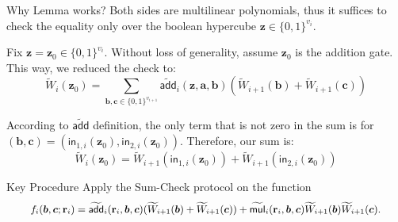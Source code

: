 \documentclass{zkdl-presentation-template}
\begin{document}
    \begin{frame}{Why Lemma works?}
        Both sides are multilinear polynomials, thus it suffices to check the equality only over the 
        boolean hypercube $\mathbf{z} \in \{0,1\}^{v_i}$.

        Fix $\mathbf{z}=\mathbf{z}_0 \in \{0,1\}^{v_i}$. Without loss of generality, assume
        $\mathbf{z}_0$ is the addition gate. This way, we reduced the check to:
        \begin{equation*}
            \widetilde{W}_i(\mathbf{z}_0) = \sum_{\boldsymbol{b},\boldsymbol{c} \in \{0,1\}^{v_{i+1}}} \widetilde{\mathsf{add}}_i(\mathbf{z},\boldsymbol{a},\boldsymbol{b})(\widetilde{W}_{i+1}(\boldsymbol{b}) + \widetilde{W}_{i+1}(\boldsymbol{c}))
        \end{equation*}

         According to $\widetilde{\mathsf{add}}$ definition, the only term that is not
        zero in the sum is for
        $(\boldsymbol{b},\boldsymbol{c})=(\mathsf{in}_{1,i}(\mathbf{z}_0),
        \mathsf{in}_{2,i}(\mathbf{z}_0))$. Therefore, our sum is:
        \begin{equation*}
            \widetilde{W}_i(\mathbf{z}_0) = \widetilde{W}_{i+1}(\mathsf{in}_{1,i}(\mathbf{z}_0)) + \widetilde{W}_{i+1}(\mathsf{in}_{2,i}(\mathbf{z}_0))
        \end{equation*}

        \begin{alertblock}{Key Procedure}
            Apply the Sum-Check protocol on the function 
            \begin{equation*}
                \small f_i(\boldsymbol{b}, \boldsymbol{c}; \mathbf{r}_i) = \widetilde{\mathsf{add}}_i(\mathbf{r}_i, \boldsymbol{b}, \boldsymbol{c})(\widetilde{W}_{i+1}(\boldsymbol{b}) + \widetilde{W}_{i+1}(\boldsymbol{c})) + \widetilde{\mathsf{mul}}_i(\mathbf{r}_i, \boldsymbol{b}, \boldsymbol{c})\widetilde{W}_{i+1}(\boldsymbol{b})\widetilde{W}_{i+1}(\boldsymbol{c}).
            \end{equation*}
        \end{alertblock}
    \end{frame}
\end{document}
